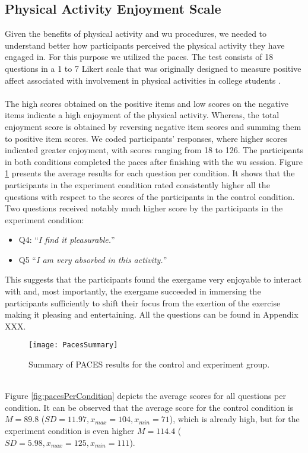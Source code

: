 \subsection{Physical Activity Enjoyment Scale}
Given the benefits of physical activity and \acrshort{wu} procedures, we needed to understand better how participants perceived the physical activity they have engaged in. For this purpose we utilized the \acrfull{paces}. The test consists of 18 questions in a 1 to 7 Likert scale that was originally designed to measure positive affect associated with involvement in physical activities in college students \cite{kendzierski1991physical}.  \\\\The high scores obtained on the positive items and low scores on the negative items indicate a high enjoyment of the physical activity. Whereas, the total enjoyment score is obtained by reversing negative item scores and summing them to positive item scores. We coded participants' responses, where higher scores indicated greater enjoyment, with scores ranging from 18 to 126. The participants in both conditions completed the \gls{paces} after finishing with the \acrshort{wu} session. Figure \ref{fig:pacees} presents the average results for each question per condition. It shows that the participants in the experiment condition rated consistently higher all the questions with respect to the scores of the participants in the control condition. Two questions received notably much higher score by the participants in the experiment condition: \begin{itemize}
\item Q4: ``\textit{I find it pleasurable.}''
\item Q5 ``\textit{I am very absorbed in this activity.}''
\end{itemize} 
This suggests that the participants found the exergame very enjoyable to interact with  and, most importantly, the exergame succeeded in immersing the participants sufficiently to shift their focus from the exertion of the exercise making it pleasing and entertaining. All the questions can be found in Appendix XXX.\\
\begin{figure}[h]
    \centering
    \texttt{[image: PacesSummary]}
    \caption{Summary of PACES results for the control and experiment group.}
    \label{fig:pacees}
\end{figure}\\
Figure \ref{fig:pacesPerCondition} depicts the average scores for all questions per condition. It can be observed that the average score for the control condition is \begin{math}M = 89.8 \end{math} (\begin{math} SD = 11.97, x_{max}= 104, x_{min}= 71\end{math}), which is already high, but for the experiment condition is even higher  \begin{math}M = 114.4 \end{math} (\begin{math} SD = 5.98, x_{max}= 125, x_{min}= 111\end{math}).\\
